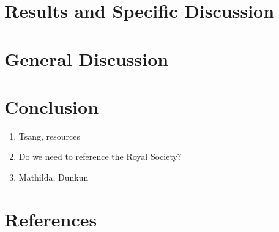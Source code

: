 \documentclass[10pt]{iopart}
\begin{document}

\section{Results and Specific Discussion}


\section{General Discussion}



\section{Conclusion}

\ack

\begin{enumerate}
	\item Tsang, resources
	\item Do we need to reference the Royal Society?
	\item Mathilda, Dunkun
\end{enumerate}

\section*{References}


\end{document}
